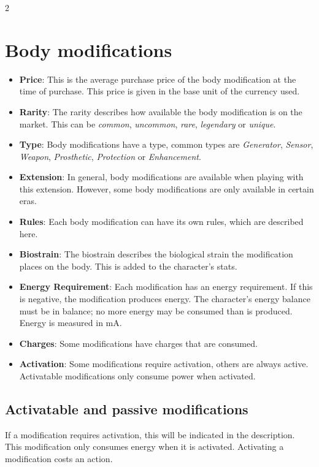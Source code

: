 \begin{multicols}{2}
\section{Body modifications}
\begin{itemize}
    \item \textbf{Price}: This is the average purchase price of the body modification at the time of purchase. This price is given in the base unit of the currency used.
    \item \textbf{Rarity}: The rarity describes how available the body modification is on the market. This can be \textit{common}, \textit{uncommon}, \textit{rare}, \textit{legendary} or \textit{unique}.
    \item \textbf{Type}: Body modifications have a type, common types are \textit{Generator}, \textit{Sensor}, \textit{Weapon}, \textit{Prosthetic}, \textit{Protection} or \textit{Enhancement}.
    \item \textbf{Extension}: In general, body modifications are available when playing with this extension. However, some body modifications are only available in certain eras.
    \item \textbf{Rules}: Each body modification can have its own rules, which are described here.
    \item \textbf{Biostrain}: The biostrain describes the biological strain the modification places on the body. This is added to the character's stats.
    \item \textbf{Energy Requirement}: Each modification has an energy requirement. If this is negative, the modification produces energy. The character's energy balance must be in balance; no more energy may be consumed than is produced. Energy is measured in mA.
    \item \textbf{Charges}: Some modifications have charges that are consumed.
    \item \textbf{Activation}: Some modifications require activation, others are always active. Activatable modifications only consume power when activated.
\end{itemize}

\subsection{Activatable and passive modifications}

If a modification requires activation, this will be indicated in the description. This modification only consumes energy when it is activated. Activating a modification costs an action.


\end{multicols}
